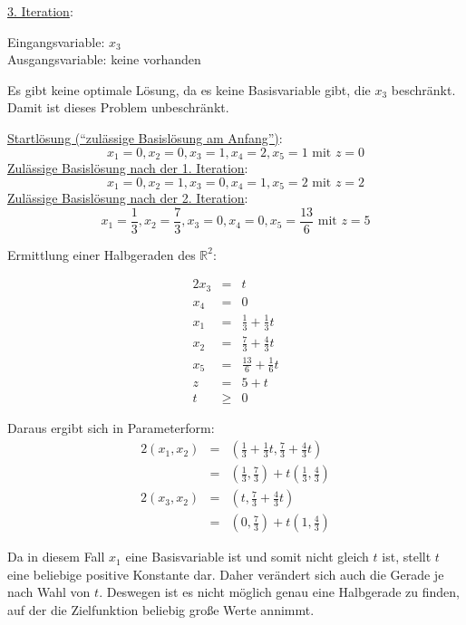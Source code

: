 \documentclass[10pt,a4paper,oneside,ngerman,numbers=noenddot]{scrartcl}
\begin{document}
		\underline{3. Iteration}:
		
		Eingangsvariable: $x_{3}$ \\
		Ausgangsvariable: keine vorhanden
		
		Es gibt keine optimale Lösung, da es keine Basisvariable gibt, die $x_{3}$ beschränkt. Damit ist dieses Problem unbeschränkt.
		
		\underline{Startlösung ("`zulässige Basislösung am Anfang"')}:
		\[
			x_{1} = 0, x_{2} = 0, x_{3} = 1, x_{4} = 2, x_{5} = 1 \text{ mit } z = 0
		\]
		\underline{Zulässige Basislösung nach der 1. Iteration}:
		\[
			x_{1} = 0, x_{2} = 1, x_{3} = 0, x_{4} = 1, x_{5} = 2 \text{ mit } z = 2
		\]
		\underline{Zulässige Basislösung nach der 2. Iteration}:
		\[
			x_{1} = \frac{1}{3}, x_{2} = \frac{7}{3}, x_{3} = 0, x_{4} = 0, x_{5} = \frac{13}{6} \text{ mit } z = 5
		\]
		
		Ermittlung einer Halbgeraden des $\mathbb{R}^{2}$:
		
		\begin{alignat*}{2}
			x_{3} &=& t \\
			x_{4} &=& 0 \\
			x_{1} &=& \frac{1}{3} + \frac{1}{3}t \\
			x_{2} &=& \frac{7}{3} + \frac{4}{3}t \\
			x_{5} &=& \frac{13}{6} + \frac{1}{6}t \\
			z &=& 5 + t \\
			t &\geq & 0
		\end{alignat*}
		
		Daraus ergibt sich in Parameterform: 
		\begin{alignat*}{2}
			(x_{1}, x_{2}) &=& \left(\frac{1}{3} + \frac{1}{3}t, \frac{7}{3} + \frac{4}{3}t\right) \\
			&=& \left(\frac{1}{3}, \frac{7}{3}\right) + t\left(\frac{1}{3}, \frac{4}{3}\right)
		\end{alignat*}
		\begin{alignat*}{2}
			(x_{3}, x_{2}) &=& \left(t, \frac{7}{3} + \frac{4}{3}t\right) \\
			&=& \left(0, \frac{7}{3}\right) + t\left(1, \frac{4}{3}\right)
		\end{alignat*}
		
		Da in diesem Fall $x_{1}$ eine Basisvariable ist und somit nicht gleich $t$ ist, stellt $t$ eine beliebige positive Konstante dar. Daher verändert sich auch die Gerade je nach Wahl von $t$. Deswegen ist es nicht möglich genau eine Halbgerade zu finden, auf der die Zielfunktion beliebig große Werte annimmt.
\end{document}
